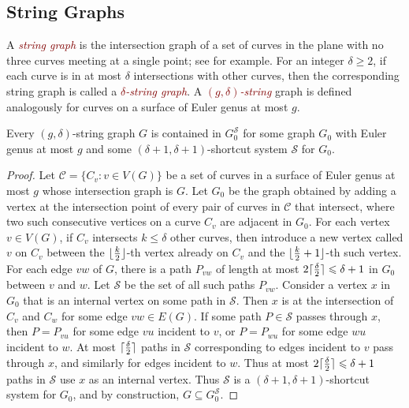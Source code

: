 \documentclass{patmorin}
\newcommand{\defin}[1]{\textcolor{Maroon}{\emph{#1}}}
\DeclarePairedDelimiter{\ceil}{\lceil}{\rceil}
\DeclarePairedDelimiter{\floor}{\lfloor}{\rfloor}
\renewcommand{\SS}{\mathcal{S}}
\renewcommand{\geq}{\geqslant}
\renewcommand{\leq}{\leqslant}
\begin{document}
\subsection{String Graphs}

A \defin{string graph} is the intersection graph of a set of curves in the plane with no three curves meeting at a single point; see  \cite{PachToth-DCG02,FP10,FP14} for example. For an integer $\delta\geq 2$, if each curve is in at most $\delta$ intersections with other curves, then the corresponding string graph is called a \defin{$\delta$-string graph}. A \defin{$(g,\delta)$-string} graph is defined analogously for curves on a surface of Euler genus at most $g$.

\begin{lem}
\label{StringShortcut}
Every $(g,\delta)$-string graph $G$ is contained in $G_0^\SS$ for some graph $G_0$ with Euler genus at most $g$ and some $(\delta+1,\delta+1 )$-shortcut system $\SS$ for $G_0$.
\end{lem}

\begin{proof}
Let $\mathcal{C}=\{C_v:v\in V(G)\}$ be a set of curves in a surface of Euler genus at most $g$ whose intersection graph is $G$.  Let $G_0$ be the graph obtained by adding a vertex at the intersection point of every pair of curves in $\mathcal{C}$ that intersect,  where two such consecutive vertices on a curve $C_v$ are adjacent in $G_0$. For each vertex $v\in V(G)$, if $C_v$ intersects $k\leq\delta$ other curves, then introduce a new vertex called $v$ on $C_v$ between the
$\floor{\frac{k}{2}}$-th vertex already on $C_v$ and the $\floor{\frac{k}{2}+1}$-th such vertex. For each edge $vw$ of $G$, there is a path $P_{vw}$ of length at most $2\ceil{\frac{\delta}{2}}\leq \delta+1$ in $G_0$ between $v$ and $w$. Let $\SS$ be the set of all such paths $P_{vw}$. Consider a vertex $x$ in $G_0$ that is an internal vertex on some path in $\SS$. Then $x$ is at the intersection of $C_v$ and $C_w$ for some edge $vw\in E(G)$. If some path $P\in \SS$ passes through $x$, then $P=P_{vu}$ for some edge $vu$ incident to $v$, or $P=P_{wu}$ for some edge $wu$ incident to $w$. At most $\ceil{\frac{\delta}{2}}$ paths in $\SS$ corresponding to edges incident to $v$ pass through $x$, and similarly for edges incident to $w$. Thus at most $2\ceil{\frac{\delta}{2}}\leq\delta+1$ paths in $\SS$ use $x$ as an internal vertex. Thus $\SS$ is a $(\delta+1,\delta+1)$-shortcut system for $G_0$, and by construction, $G \subseteq G_0^\SS$.
\end{proof}
\end{document}
